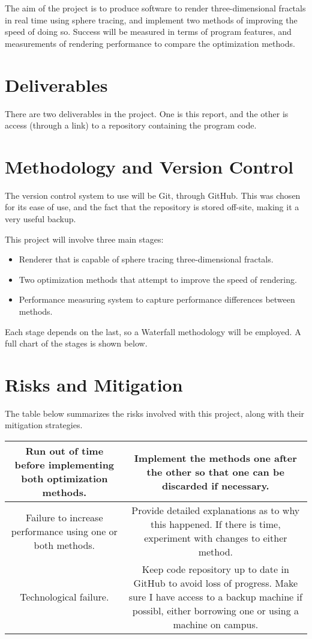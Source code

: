 The aim of the project is to produce software to render three-dimensional fractals in real time using sphere tracing, and implement two methods of improving the speed of doing so. Success will be measured in terms of program features, and measurements of rendering performance to compare the optimization methods.

\section{Deliverables}

There are two deliverables in the project. One is this report, and the other is access (through a link) to a repository containing the program code.

\section{Methodology and Version Control}

The version control system to use will be Git, through GitHub. This was chosen for its ease of use, and the fact that the repository is stored off-site, making it a very useful backup.\newline

This project will involve three main stages:

\begin{itemize}
	\item Renderer that is capable of sphere tracing three-dimensional fractals.
	\item Two optimization methods that attempt to improve the speed of rendering.
	\item Performance measuring system to capture performance differences between methods.
\end{itemize}

Each stage depends on the last, so a Waterfall methodology will be employed. A full chart of the stages is shown below.

\section{Risks and Mitigation}

The table below summarizes the risks involved with this project, along with their mitigation strategies.

\begin{tabular}{||c|c||}
	\hline\hline
	Run out of time before implementing both optimization methods. & Implement the methods one after the other so that one can be discarded if necessary.\\
	\hline
	Failure to increase performance using one or both methods. & Provide detailed explanations as to why this happened. If there is time, experiment with changes to either method.\\
	\hline
	Technological failure. & Keep code repository up to date in GitHub to avoid loss of progress. Make sure I have access to a backup machine if possibl, either borrowing one or using a machine on campus.\\
	\hline\hline
\end{tabular}
